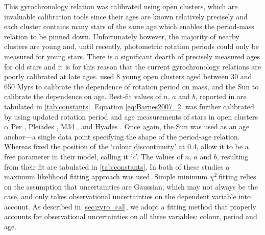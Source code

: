 \documentclass[10pt,preprint]{aastex}
\newcommand{\chit}{$\chi^2$}
\begin{document}
This gyrochronology relation was calibrated using open clusters, which are invaluable calibration tools since their ages are known relatively precisely and each cluster contains many stars of the same age which enables the period-mass relation to be pinned down.
Unfortunately however, the majority of nearby clusters are young and, until recently, photometric rotation periods could only be measured for young stars.
There is a significant dearth of precisely measured ages for old stars and it is for this reason that the current gyrochronology relations are poorly calibrated at late ages.
\citet{Barnes2007} used 8 young open clusters aged between 30 and 650 Myrs to calibrate the dependence of rotation period on mass, and the Sun to calibrate the dependence on age.
Best-fit values of $n$, $a$ and $b$, reported in \citet{Barnes2007} are tabulated in \ref{tab:constants}.
Equation \ref{eq:Barnes2007_2} was further calibrated by \citet{Mamajek2008} using updated rotation period and age measurements of stars in open clusters $\alpha$ Per \citep{Prosser1995}, Pleiades \citep{Prosser1995, Krishnamurthi1998}, M34 \citep{Meibom2011_M34}, and Hyades \citep[][; Henry, private comm.]{Radick1987, Radick1995, Prosser1995, Paulson2004}.
Once again, the Sun was used as an age anchor---a single data point specifying the shape of the period-age relation.
Whereas \citet{Barnes2007} fixed the position of the `colour discontinuity' at 0.4, \citet{Mamajek2008} allow it to be a free parameter in their model, calling it `$c$'.
The values of $n$, $a$ and $b$, resulting from their fit are tabulated in \ref{tab:constants}.
In both of these studies a maximum likelihood fitting approach was used.
Simple minimum \chit$~$fitting relies on the assumption that uncertainties are Gaussian, which may not always be the case, and only takes observational uncertainties on the dependent variable into account.
As described in \textsection \ref{sec:gyro_cal}, we adopt a fitting method that properly accounts for observational uncertainties on all three variables: colour, period and age.
\end{document}
